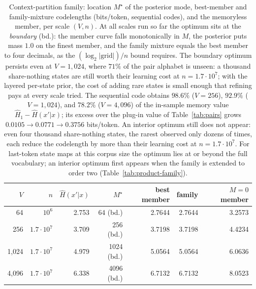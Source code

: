 \documentclass[11pt]{article}
\begin{document}
\begin{table}[ht]
\centering
\begin{tabular}{rrrrrrr}
\toprule
$V$ & $n$ & $\hat H(x'|x)$ & $M^\star$ & best member & family & $M=0$ member \\
\midrule
 64 & $10^6$        & 2.753 &  64 (bd.) & 2.7644 & 2.7644 & 3.2573 \\
256 & $1.7\cdot10^7$ & 3.709 & 256 (bd.) & 3.7198 & 3.7198 & 4.4234 \\
1{,}024 & $1.7\cdot10^7$ & 4.979 & 1024 (bd.) & 5.0564 & 5.0564 & 6.0636 \\
4{,}096 & $1.7\cdot10^7$ & 6.338 & 4096 (bd.) & 6.7132 & 6.7132 & 8.0523 \\
\bottomrule
\end{tabular}
\caption{Context-partition family: location $M^\star$ of the posterior
  mode, best-member and family-mixture codelengths (bits/token,
  sequential codes), and the memoryless member, per scale $(V,n)$.  At
  all scales run so far the optimum sits at the \emph{boundary} (bd.):
  the member curve falls monotonically in $M$, the posterior puts mass
  $1.0$ on the finest member, and the family mixture equals the best
  member to four decimals, as the $(\log_2|\mathrm{grid}|)/n$ bound
  requires.  The boundary optimum persists even at $V=1{,}024$, where
  $71\%$ of the pair alphabet is unseen: a thousand share-nothing
  states are still worth their learning cost at $n=1.7\cdot10^7$; with
  the layered per-state prior, the cost of adding rare states is small
  enough that refining pays at every scale tried.  The sequential code
  obtains $98.6\%$ ($V=256$), $92.9\%$ ($V=1{,}024$), and $78.2\%$
  ($V=4{,}096$) of the in-sample memory value
  $\hat H_1 - \hat H(x'|x)$; its excess over the plug-in value of
  Table~\ref{tab:pairs} grows $0.0105 \to 0.0771 \to 0.3756$
  bits/token.  An interior optimum still does not appear: even four
  thousand share-nothing states, the rarest observed only dozens of
  times, each reduce the codelength by more than their learning cost at
  $n=1.7\cdot10^7$.  For last-token state maps at this corpus size the
  optimum lies at or beyond the full vocabulary; an interior optimum
  first appears when the family is extended to order two
  (Table~\ref{tab:product-family}).}
\label{tab:state-family}
\end{table}
\end{document}
